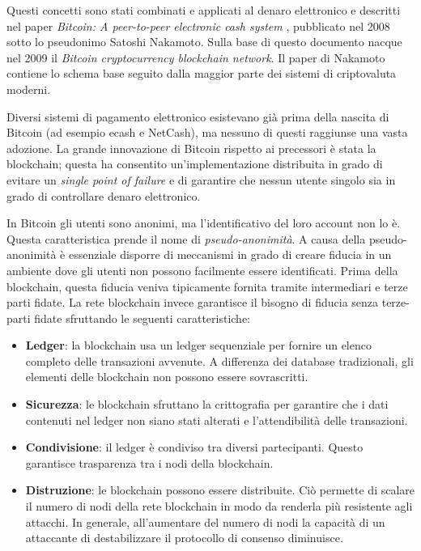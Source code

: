 Questi concetti sono stati combinati e applicati al denaro elettronico e
descritti nel paper \textit{Bitcoin: A peer-to-peer electronic cash system} \cite{nakamoto2008bitcoin}, pubblicato
nel 2008 sotto lo pseudonimo Satoshi Nakamoto. Sulla base di questo documento
nacque nel 2009 il \textit{Bitcoin cryptocurrency blockchain network}.
Il paper di Nakamoto contiene lo schema base
seguito dalla maggior parte dei sistemi di criptovaluta moderni.

Diversi sistemi di pagamento elettronico esistevano già prima della nascita di Bitcoin
(ad esempio ecash e NetCash), ma nessuno di questi raggiunse una vasta adozione.
La grande innovazione di Bitcoin rispetto ai precessori è stata la blockchain;
questa ha consentito un'implementazione distribuita in grado
di evitare un \textit{single point of failure} e di garantire che nessun utente singolo
sia in grado di controllare denaro elettronico.

In Bitcoin gli utenti sono anonimi, ma l'identificativo
del loro account non lo è. Questa caratteristica prende il nome di \textit{pseudo-anonimità}.
A causa della pseudo-anonimità è essenziale disporre di meccanismi in grado di creare
fiducia in un ambiente dove gli utenti non possono facilmente essere identificati. Prima
della \mbox{blockchain}, questa fiducia veniva tipicamente fornita tramite intermediari e terze parti fidate.
La rete blockchain invece garantisce il bisogno di fiducia senza terze-parti fidate sfruttando
le seguenti caratteristiche:
\begin{itemize}
	\item \textbf{Ledger}: la blockchain usa un ledger sequenziale per fornire un
	      elenco completo delle transazioni avvenute. A differenza dei database tradizionali,
	      gli elementi delle blockchain non possono essere sovrascritti.
	\item \textbf{Sicurezza}: le blockchain sfruttano la crittografia per garantire che i dati contenuti
	      nel ledger non siano stati alterati e l'attendibilità delle transazioni.
	\item \textbf{Condivisione}: il ledger è condiviso tra diversi partecipanti. Questo garantisce
	      trasparenza tra i nodi della blockchain.
	\item \textbf{Distruzione}: le blockchain possono essere distribuite. Ciò permette di scalare
	      il numero di nodi della rete blockchain in modo da renderla più resistente agli attacchi.
	      In generale, all'aumentare del numero di nodi la capacità di un attaccante di destabilizzare il
	      protocollo di consenso diminuisce.
\end{itemize}

